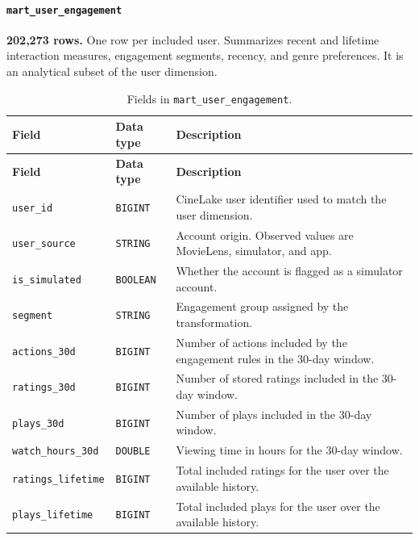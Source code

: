 \documentclass[a4paper,12pt]{article}
\newcommand{\dbsep}{\_\allowbreak}
\begin{document}
\paragraph{\texttt{mart\dbsep user\dbsep engagement}}
\textbf{202,273 rows.} One row per included user.
Summarizes recent and lifetime interaction measures, engagement segments, recency, and genre preferences. It is an analytical subset of the user dimension.

\begingroup
\small
\setlength{\tabcolsep}{4pt}
\renewcommand{\arraystretch}{1.1}
\begin{longtable}{@{}>{\raggedright\arraybackslash}p{}
                    >{\raggedright\arraybackslash}p{}
                    >{\raggedright\arraybackslash}p{}@{}}
\caption{Fields in \texttt{mart\dbsep user\dbsep engagement}.}\\
\toprule
\textbf{Field} & \textbf{Data type} & \textbf{Description}\\
\midrule
\endfirsthead
\toprule
\textbf{Field} & \textbf{Data type} & \textbf{Description}\\
\midrule
\endhead
\bottomrule
\endfoot
\texttt{user\dbsep id} & \texttt{BIGINT} & CineLake user identifier used to match the user dimension.\\
\texttt{user\dbsep source} & \texttt{STRING} & Account origin. Observed values are MovieLens, simulator, and app.\\
\texttt{is\dbsep simulated} & \texttt{BOOLEAN} & Whether the account is flagged as a simulator account.\\
\texttt{segment} & \texttt{STRING} & Engagement group assigned by the transformation.\\
\texttt{actions\dbsep 30d} & \texttt{BIGINT} & Number of actions included by the engagement rules in the 30-day window.\\
\texttt{ratings\dbsep 30d} & \texttt{BIGINT} & Number of stored ratings included in the 30-day window.\\
\texttt{plays\dbsep 30d} & \texttt{BIGINT} & Number of plays included in the 30-day window.\\
\texttt{watch\dbsep hours\dbsep 30d} & \texttt{DOUBLE} & Viewing time in hours for the 30-day window.\\
\texttt{ratings\dbsep lifetime} & \texttt{BIGINT} & Total included ratings for the user over the available history.\\
\texttt{plays\dbsep lifetime} & \texttt{BIGINT} & Total included plays for the user over the available history.\\

\end{longtable}
\end{document}
